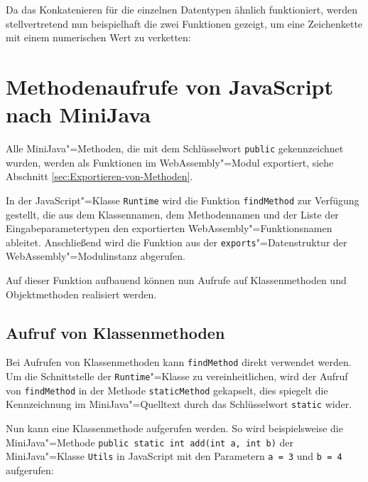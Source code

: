 Da das Konkatenieren für die einzelnen Datentypen ähnlich funktioniert, werden stellvertretend nun beispielhaft die zwei Funktionen gezeigt, um eine Zeichenkette mit einem numerischen Wert zu verketten:


\section{Methodenaufrufe von JavaScript nach MiniJava}

Alle MiniJava"=Methoden, die mit dem Schlüsselwort \lstinline{public} gekennzeichnet wurden, werden als Funktionen im WebAssembly"=Modul exportiert, siehe Abschnitt \ref{sec:Exportieren-von-Methoden}.

In der JavaScript"=Klasse \lstinline{Runtime} wird die Funktion \lstinline{findMethod} zur Verfügung gestellt, die aus dem Klassennamen, dem Methodennamen und der Liste der Eingabeparametertypen den exportierten WebAssembly"=Funktionsnamen ableitet. Anschließend wird die Funktion aus der \lstinline{exports}"=Datenstruktur der WebAssembly"=Modulinstanz abgerufen.

\pagebreak


Auf dieser Funktion aufbauend können nun Aufrufe auf Klassenmethoden und Objektmethoden realisiert werden.

\subsection{Aufruf von Klassenmethoden}

Bei Aufrufen von Klassenmethoden kann \lstinline{findMethod} direkt verwendet werden. Um die Schnittstelle der \lstinline{Runtime}"=Klasse zu vereinheitlichen, wird der Aufruf von \lstinline{findMethod} in der Methode \lstinline{staticMethod} gekapselt, dies spiegelt die Kennzeichnung im MiniJava"=Quelltext durch das Schlüsselwort \lstinline{static} wider.



Nun kann eine Klassenmethode aufgerufen werden. So wird beispielsweise die MiniJava"=Methode \lstinline{public static int add(int a, int b)} der MiniJava"=Klasse \lstinline{Utils} in JavaScript mit den Parametern \lstinline{a = 3} und \lstinline{b = 4} aufgerufen:



